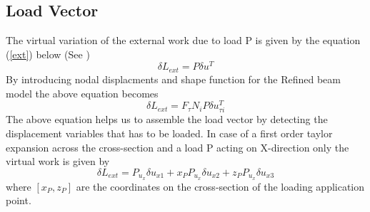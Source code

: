 \documentclass[a4paper,12pt]{article}
\begin{document}
\subsection*{Load Vector}
\indent\indent\indent\indent The virtual variation of the external work due to load P is given by the equation (\ref{ext}) below (See \cite{carrera2011beam})           
\begin{equation}
\delta L_{ext} = P\delta u^{T}
\label{ext}
\end{equation}
By introducing nodal displacments and shape function for the Refined beam model the above equation becomes 
\begin{equation}
\delta L_{ext} = F_{\tau}N_{i}P\delta u^{T}_{\tau i}
\end{equation}
The above equation helps us to assemble the load vector  by detecting the displacement variables that has to be loaded. In case of a first order taylor expansion across the cross-section and a load P acting on X-direction only the virtual work is given by 
\begin{equation}
\delta L_{ext} = P_{u_{x}}\delta u_{x1} + x_{P} P_{u_{x}}\delta u_{x2} + z_{P} P_{u_{x}}\delta u_{x3}
\end{equation}
where $[x_{P}, z_{P}] $ are the coordinates on the cross-section of the loading
application point.\\
\end{document}
